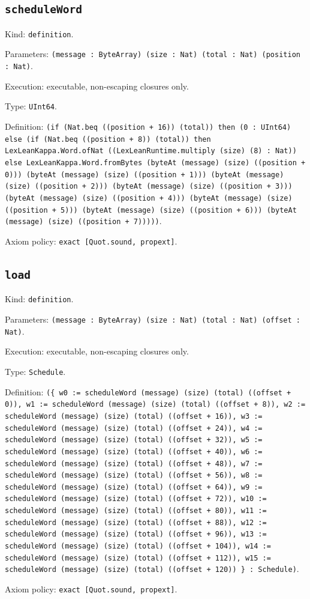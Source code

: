 \documentclass[11pt]{article}
\begin{document}
\subsection*{\texttt{scheduleWord}}
\noindent Kind: \texttt{definition}.\par
\noindent Parameters: \texttt{(message : ByteArray) (size : Nat) (total : Nat) (position : Nat)}.\par
\noindent Execution: executable, non-escaping closures only.\par
\noindent Type: \texttt{UInt64}.\par
\noindent Definition: \texttt{(if (Nat.beq ((position + 16)) (total)) then (0 : UInt64) else (if (Nat.beq ((position + 8)) (total)) then LexLeanKappa.Word.ofNat ((LexLeanRuntime.multiply (size) (8) : Nat)) else LexLeanKappa.Word.fromBytes (byteAt (message) (size) ((position + 0))) (byteAt (message) (size) ((position + 1))) (byteAt (message) (size) ((position + 2))) (byteAt (message) (size) ((position + 3))) (byteAt (message) (size) ((position + 4))) (byteAt (message) (size) ((position + 5))) (byteAt (message) (size) ((position + 6))) (byteAt (message) (size) ((position + 7)))))}.\par
\noindent Axiom policy: \texttt{exact [Quot.sound, propext]}.\par
\subsection*{\texttt{load}}
\noindent Kind: \texttt{definition}.\par
\noindent Parameters: \texttt{(message : ByteArray) (size : Nat) (total : Nat) (offset : Nat)}.\par
\noindent Execution: executable, non-escaping closures only.\par
\noindent Type: \texttt{Schedule}.\par
\noindent Definition: \texttt{(\{ w0 := scheduleWord (message) (size) (total) ((offset + 0)), w1 := scheduleWord (message) (size) (total) ((offset + 8)), w2 := scheduleWord (message) (size) (total) ((offset + 16)), w3 := scheduleWord (message) (size) (total) ((offset + 24)), w4 := scheduleWord (message) (size) (total) ((offset + 32)), w5 := scheduleWord (message) (size) (total) ((offset + 40)), w6 := scheduleWord (message) (size) (total) ((offset + 48)), w7 := scheduleWord (message) (size) (total) ((offset + 56)), w8 := scheduleWord (message) (size) (total) ((offset + 64)), w9 := scheduleWord (message) (size) (total) ((offset + 72)), w10 := scheduleWord (message) (size) (total) ((offset + 80)), w11 := scheduleWord (message) (size) (total) ((offset + 88)), w12 := scheduleWord (message) (size) (total) ((offset + 96)), w13 := scheduleWord (message) (size) (total) ((offset + 104)), w14 := scheduleWord (message) (size) (total) ((offset + 112)), w15 := scheduleWord (message) (size) (total) ((offset + 120)) \} : Schedule)}.\par
\noindent Axiom policy: \texttt{exact [Quot.sound, propext]}.\par
\end{document}
